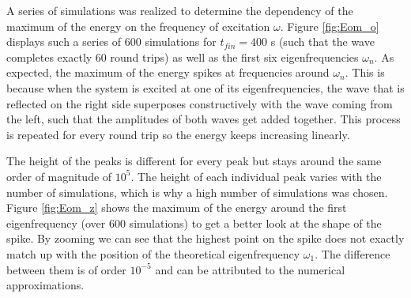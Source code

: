 \documentclass[a4paper,12pt,twoside]{article}
\begin{document}
    A series of simulations was realized to determine the dependency of the maximum of the energy on the frequency of excitation $\omega$. Figure \ref{fig:Eom_o} displays such a series of 600 simulations for $t_{fin}=400$ s (such that the wave completes exactly 60 round trips) as well as the first six eigenfrequencies $\omega_n$. As expected, the maximum of the energy spikes at frequencies around $\omega_n$. This is because when the system is excited at one of its eigenfrequencies, the wave that is reflected on the right side superposes constructively with the wave coming from the left, such that the amplitudes of both waves get added together. This process is repeated for every round trip so the energy keeps increasing linearly.
    
    The height of the peaks is different for every peak but stays around the same order of magnitude of $10^5$. The height of each individual peak varies with the number of simulations, which is why a high number of simulations was chosen. Figure \ref{fig:Eom_z} shows the maximum of the energy around the first eigenfrequency (over 600 simulations) to get a better look at the shape of the spike. By zooming we can see that the highest point on the spike does not exactly match up with the position of the theoretical eigenfrequency $\omega_1$. The difference between them is of order $10^{-5}$ and can be attributed to the numerical approximations.
    
\end{document}
